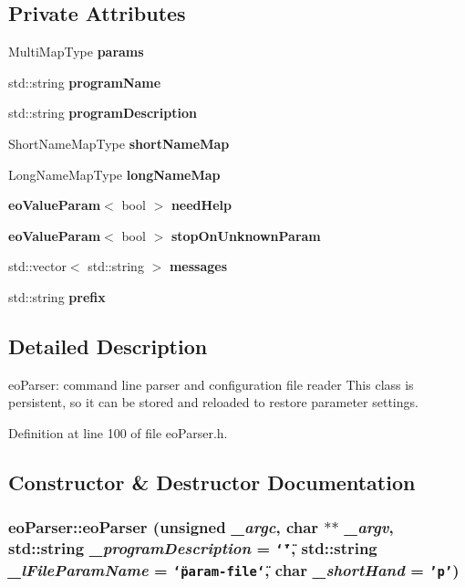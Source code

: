 \subsection*{Private Attributes}
\begin{CompactItemize}
\item 
Multi\-Map\-Type {\bf params}\label{classeo_parser_r0}

\item 
std::string {\bf program\-Name}\label{classeo_parser_r1}

\item 
std::string {\bf program\-Description}\label{classeo_parser_r2}

\item 
Short\-Name\-Map\-Type {\bf short\-Name\-Map}\label{classeo_parser_r3}

\item 
Long\-Name\-Map\-Type {\bf long\-Name\-Map}\label{classeo_parser_r4}

\item 
{\bf eo\-Value\-Param}$<$ bool $>$ {\bf need\-Help}\label{classeo_parser_r5}

\item 
{\bf eo\-Value\-Param}$<$ bool $>$ {\bf stop\-On\-Unknown\-Param}\label{classeo_parser_r6}

\item 
std::vector$<$ std::string $>$ {\bf messages}\label{classeo_parser_r7}

\item 
std::string {\bf prefix}\label{classeo_parser_r8}

\end{CompactItemize}


\subsection{Detailed Description}
eo\-Parser: command line parser and configuration file reader This class is persistent, so it can be stored and reloaded to restore parameter settings. 



Definition at line 100 of file eo\-Parser.h.

\subsection{Constructor \& Destructor Documentation}
\subsubsection{\setlength{\rightskip}{0pt plus 5cm}eo\-Parser::eo\-Parser (unsigned {\em \_\-argc}, char $\ast$$\ast$ {\em \_\-argv}, std::string {\em \_\-program\-Description} = {\tt \char`\"{}\char`\"{}}, std::string {\em \_\-l\-File\-Param\-Name} = {\tt \char`\"{}param-file\char`\"{}}, char {\em \_\-short\-Hand} = {\tt 'p'})}\label{classeo_parser_a0}


